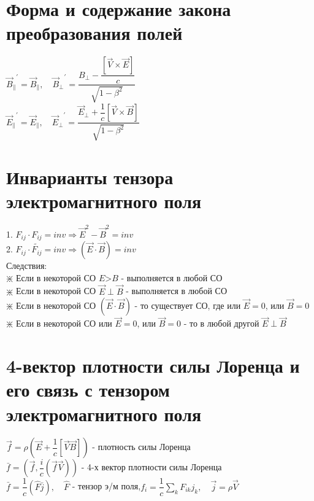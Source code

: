\begin{multicols*}{2}
		\section{Форма и содержание закона преобразования полей}
		${\vec{B}_{\parallel}}^\prime = \vec{B}_{\parallel}, \quad {\vec{B}_{\perp}}^\prime = \dfrac{{B}_{\perp} - \dfrac{\left[\vec{V}\times \vec{E}\right]}{c}}{\sqrt{1-\beta^2}}$\\
		${\vec{E}_{\parallel}}^\prime = \vec{E}_{\parallel}, \quad {\vec{E}_{\perp}}^\prime = \dfrac{{\vec{E}}_{\perp} + \dfrac{1}{c}\left[\vec{V}\times \vec{B}\right]}{\sqrt{1-\beta^2}}$
		
		\section{Инварианты тензора электромагнитного поля}
		1. $F_{ij}\cdot F_{ij} = inv \Rightarrow \vec{E}^2-\vec{B}^2 = inv$\\
		2. $F_{ij}\cdot \tilde{F_{ij}}  = inv \Rightarrow (\vec{E}\cdot \vec{B}) = inv$\\
		Следствия:\\
		$\divideontimes$ Если в некоторой СО $E$>$B$ - выполняется в любой СО\\
		$\divideontimes$ Если в некоторой СО $\vec{E}\perp \vec{B}$ - выполняется в любой СО\\
		$\divideontimes$ Если в некоторой СО $(\vec{E}\cdot \vec{B})$ - то существует СО, где или $\vec{E} = 0$, или $\vec{B} = 0$\\
		$\divideontimes$ Если в некоторой СО или $\vec{E} = 0$, или $\vec{B} = 0$ - то в любой другой $\vec{E}\perp \vec{B}$
		
		\section{4-вектор плотности силы Лоренца и его связь с тензором электромагнитного поля}
		$\vec{f} = \rho (\vec{E} + \dfrac{1}{c}\left[\vec{V}\vec{B}\right])$ - плотность силы Лоренца\\
		$\bar{f} = (\vec{f}, \dfrac{i}{c}(\vec{f}\vec{V}))$ - 4-х вектор плотности силы Лоренца\\
		$\bar{f} = \dfrac{1}{c}(\hat{F}\bar{j}), \quad \hat{F}$ - тензор э/м поля,\quad $f_i = \dfrac{1}{c}\sum_{k}^{}F_{ik}j_k, \quad \vec{j} = \rho \vec{V}$
		

\end{multicols*}
